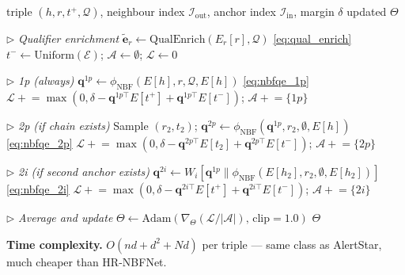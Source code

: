 \documentclass[10pt,journal,compsoc]{IEEEtran}
\begin{document}
\begin{algorithm}[t]
\caption{HR-NBFNet-CQ: Training Step}
\label{alg:nbfstarqe}
\begin{algorithmic}[1]
\Require triple $(h, r, t^+, \mathcal{Q})$,
  neighbour index $\mathcal{I}_{\mathrm{out}}$,
  anchor index $\mathcal{I}_{\mathrm{in}}$,
  margin $\delta$
\Ensure updated $\Theta$

\Statex \hfill $\triangleright$
  \textit{Qualifier enrichment}
\State $\tilde{\mathbf{e}}_r \leftarrow
  \mathrm{QualEnrich}(E_r[r], \mathcal{Q})$
  \hfill \eqref{eq:qual_enrich}
\State $t^- \leftarrow \mathrm{Uniform}(\mathcal{E})$;\;
  $\mathcal{A} \leftarrow \emptyset$;\;
  $\mathcal{L} \leftarrow 0$

\Statex \hfill $\triangleright$
  \textit{1p (always)}
\State $\mathbf{q}^{1p} \leftarrow
  \phi_{\mathrm{NBF}}(E[h], r,
  \mathcal{Q}, E[h])$
  \hfill \eqref{eq:nbfqe_1p}
\State $\mathcal{L} \mathrel{+}=
  \max(0, \delta - \mathbf{q}^{1p\top}E[t^+]
  + \mathbf{q}^{1p\top}E[t^-])$;\;
  $\mathcal{A} \mathrel{+}= \{1p\}$

\Statex \hfill $\triangleright$
  \textit{2p (if chain exists)}
  \State Sample $(r_2, t_2)$;\;
  $\mathbf{q}^{2p} \leftarrow
  \phi_{\mathrm{NBF}}(\mathbf{q}^{1p},
  r_2, \emptyset, E[h])$
  \hfill \eqref{eq:nbfqe_2p}
  \State $\mathcal{L} \mathrel{+}=
    \max(0, \delta -
    \mathbf{q}^{2p\top}E[t_2] +
    \mathbf{q}^{2p\top}E[t^-])$;\;
    $\mathcal{A} \mathrel{+}= \{2p\}$
\EndIf

\Statex \hfill $\triangleright$
  \textit{2i (if second anchor exists)}
  \State $\mathbf{q}^{2i} \leftarrow
    W_i[\mathbf{q}^{1p} \|
    \phi_{\mathrm{NBF}}(E[h_2],
    r_2, \emptyset, E[h_2])]$
    \hfill \eqref{eq:nbfqe_2i}
  \State $\mathcal{L} \mathrel{+}=
    \max(0, \delta -
    \mathbf{q}^{2i\top}E[t^+] +
    \mathbf{q}^{2i\top}E[t^-])$;\;
    $\mathcal{A} \mathrel{+}= \{2i\}$
\EndIf

\Statex \hfill $\triangleright$
  \textit{Average and update}
\State $\Theta \leftarrow \mathrm{Adam}(
  \nabla_\Theta(\mathcal{L}/|\mathcal{A}|),\,
  \mathrm{clip}{=}1.0)$
\State \Return $\Theta$
\end{algorithmic}
\end{algorithm}

\noindent\textbf{Time complexity.}
$O(nd + d^2 + Nd)$ per triple --- same class as
AlertStar, much cheaper than HR-NBFNet.
\end{document}
